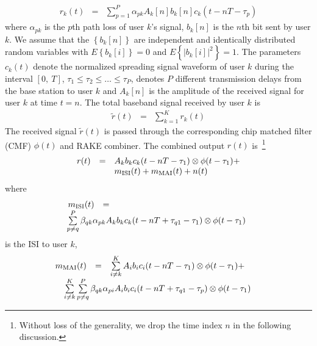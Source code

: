 \documentclass[a4paper,10pt,fleqn, twocolumn]{IEEETran}
\begin{document}
\begin{equation}
\begin{array}{rcl}
r_k(t)&=&\sum\limits_{p=1}^{P}\alpha_{pk}A_k[n]
b_k[n]c_k(t-nT-\tau_p)
\end{array}
\end{equation}
\noindent where $\alpha_{pk}$ is the $p$th path loss of user $k$'s
signal, $b_k{[n]}$ is the $n$th bit sent by user $k$. We assume
that the $\left\{b_k{[n]}\right\}$ are independent and identically
distributed random variables with $E\left\{b_k{[i]}\right\}=0$ and
$E\left\{|b_k{[i]}|^2\right\}=1$. The parameters $c_k(t)$ denote
the normalized spreading signal waveform of user $k$ during the
interval $[0,\ T]$, $\tau_1\leq\tau_2\leq\ldots\leq\tau_P$,
denotes $P$ different transmission delays from the base station to
user $k$ and $A_k[n]$ is the amplitude of the received signal for
user $k$ at time $t=n$. The total baseband signal received by user
$k$ is
\begin{equation}
\begin{array}{rcl}
\tilde{r}(t)&=&\sum\limits_{k=1}^{K}r_k(t)
\end{array}
\end{equation}
The received signal $\tilde{r}(t)$ is passed through the
corresponding chip matched filter (CMF) $\phi(t)$ and RAKE
combiner. The combined output $r(t)$ is~\footnote{Without loss of
the generality, we drop the time index $n$ in the following
discussion.}
\begin{equation}\hspace{-0.0in}
\begin{array}{rcl}
r(t)&=&A_k b_k c_k(t-nT-\tau_1)\otimes \phi(t-\tau_1)+ \\
&&\hspace{0.0in} m_{\rm ISI}(t) + m_{\rm MAI}(t) + n(t)
\end{array}\label{r_t}
\end{equation}
\noindent where
\begin{equation} \hspace{-0.05in}
\begin{array}{rcl}
 m_{\rm ISI}(t)&=&\\
 &&\hspace{-0.83in}\sum\limits^{P}_{p\neq
q}\beta_{qk} \alpha_{pk}A_kb_kc_k(t-nT+\tau_{q1}-\tau_1)\otimes
\phi(t-\tau_1)
\end{array}
\end{equation}
\noindent is the ISI to user $k$,
\begin{equation} \hspace{-0.17in}
\begin{array}{rcl}
m_{\rm MAI}(t)&=&\sum\limits_{i\neq
 k}^{K}A_ib_ic_i(t-nT-\tau_1)\otimes\phi(t-\tau_1)+\\
 &&\hspace{-0.75in}\sum\limits_{i\neq
 k}^{K}\sum\limits^{P}_{p\neq
q}\beta_{qk}
\alpha_{pi}A_ib_ic_i(t-nT+\tau_{q1}-\tau_p)\otimes\phi(t-\tau_1)
\end{array}
\end{equation}
\end{document}
